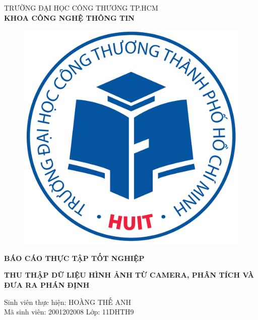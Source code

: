 \begin{center}
	\fontsize{16}{20}\selectfont
	\textsc{TRƯỜNG ĐẠI HỌC CÔNG THƯƠNG TP.HCM\\ 
		\textbf{KHOA CÔNG NGHỆ THÔNG TIN}}
	
	\vspace{0.8cm}
	\begin{figure}[htp]
		\begin{center}
			\includegraphics[scale=0.04]{logo.png}
		\end{center}
	\end{figure}
	\vspace{3cm}
	\fontsize{20}{20}\selectfont\textbf{BÁO CÁO THỰC TẬP TỐT NGHIỆP\\}
	
	\vspace{1cm}
	\fontsize{18}{20}\selectfont\textbf{THU THẬP DỮ LIỆU HÌNH ẢNH TỪ CAMERA, PHÂN TÍCH VÀ ĐƯA RA PHÁN ĐỊNH}
\end{center}
\vspace{6cm}
\begin{center}
	\fontsize{14}{20}\selectfont\textit{}{Sinh viên thực hiện: HOÀNG THẾ ANH}\\
	\fontsize{14}{20}\selectfont\textit{}{Mã sinh viên: 2001202008 Lớp: 11DHTH9}

\end{center}
\pagebreak
